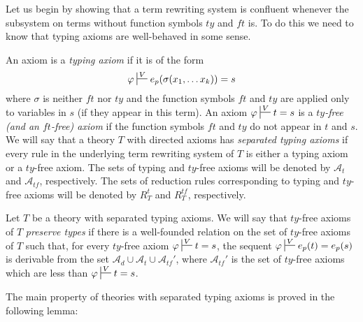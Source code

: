 \documentclass[reqno]{amsart}
\theoremstyle{definition}
\theoremstyle{remark}
\newcommand{\ft}{\mathit{ft}}
\newcommand{\ty}{\mathit{ty}}
\numberwithin{figure}{section}
\begin{document}
Let us begin by showing that a term rewriting system is confluent whenever the subsystem on terms without function symbols $\ty$ and $\ft$ is.
To do this we need to know that typing axioms are well-behaved in some sense.
\begin{defn}
An axiom is a \emph{typing axiom} if it is of the form
\[ \varphi \sststile{}{V} e_p(\sigma(x_1, \ldots x_k)) = s \]
where $\sigma$ is neither $\ft$ nor $\ty$ and the function symbols $\ft$ and $\ty$ are applied only to variables in $s$ (if they appear in this term).
An axiom $\varphi \sststile{}{V} t = s$ is a \emph{$\ty$-free (and an $\ft$-free) axiom} if the function symbols $\ft$ and $\ty$ do not appear in $t$ and $s$.
We will say that a theory $T$ with directed axioms has \emph{separated typing axioms} if every rule in the underlying term rewriting system of $T$ is either a typing axiom or a $\ty$-free axiom.
The sets of typing and $\ty$-free axioms will be denoted by $\mathcal{A}_t$ and $\mathcal{A}_{tf}$, respectively.
The sets of reduction rules corresponding to typing and $\ty$-free axioms will be denoted by $R^t_T$ and $R^{tf}_T$, respectively.

Let $T$ be a theory with separated typing axioms.
We will say that $\ty$-free axioms of $T$ \emph{preserve types} if there is a well-founded relation on the set of $\ty$-free axioms of $T$ such that,
for every $\ty$-free axiom $\varphi \sststile{}{V} t = s$, the sequent $\varphi \sststile{}{V} e_p(t) = e_p(s)$ is derivable from the set $\mathcal{A}_d \cup \mathcal{A}_t \cup \mathcal{A}_{tf}'$,
where $\mathcal{A}_{tf}'$ is the set of $\ty$-free axioms which are less than $\varphi \sststile{}{V} t = s$.
\end{defn}

The main property of theories with separated typing axioms is proved in the following lemma:
\end{document}
